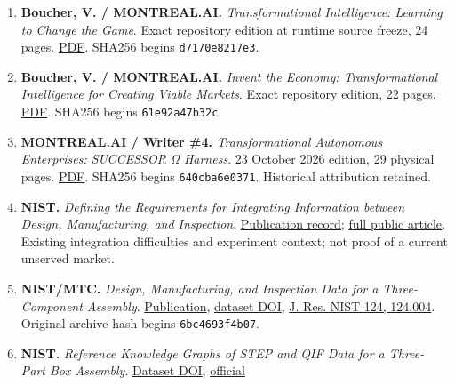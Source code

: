 \documentclass[
  11pt,
]{article}
\providecommand{\tightlist}{%
  \setlength{\itemsep}{0pt}\setlength{\parskip}{0pt}}
\begin{document}
\begin{enumerate}
\def\labelenumi{\arabic{enumi}.}
\tightlist
\item
  \textbf{Boucher, V. / MONTREAL.AI.} \emph{Transformational
  Intelligence: Learning to Change the Game}. Exact repository edition
  at runtime source freeze, 24 pages.
  \href{https://github.com/MontrealAI/AGI-Alpha-Agent-v0/blob/80b345828f34fd8a6e592977dd17ef37141305f4/docs/Transformational_Intelligence.pdf}{PDF}.
  SHA256 begins \texttt{d7170e8217e3}.
\item
  \textbf{Boucher, V. / MONTREAL.AI.} \emph{Invent the Economy:
  Transformational Intelligence for Creating Viable Markets}. Exact
  repository edition, 22 pages.
  \href{https://github.com/MontrealAI/AGI-Alpha-Agent-v0/blob/80b345828f34fd8a6e592977dd17ef37141305f4/docs/Invent_the_Economy.pdf}{PDF}.
  SHA256 begins \texttt{61e92a47b32c}.
\item
  \textbf{MONTREAL.AI / Writer \#4.} \emph{Transformational Autonomous
  Enterprises: SUCCESSOR Ω Harness}. 23 October 2026 edition, 29
  physical pages.
  \href{https://github.com/MontrealAI/AGI-Alpha-Agent-v0/blob/80b345828f34fd8a6e592977dd17ef37141305f4/docs/papers/transformational-autonomous-enterprises-v1.pdf}{PDF}.
  SHA256 begins \texttt{640cba6e0371}. Historical attribution retained.
\item
  \textbf{NIST.} \emph{Defining the Requirements for Integrating
  Information between Design, Manufacturing, and Inspection}.
  \href{https://www.nist.gov/publications/defining-requirements-integrating-information-between-design-manufacturing-and}{Publication
  record};
  \href{https://pmc.ncbi.nlm.nih.gov/articles/PMC11167730/}{full public
  article}. Existing integration difficulties and experiment context;
  not proof of a current unserved market.
\item
  \textbf{NIST/MTC.} \emph{Design, Manufacturing, and Inspection Data
  for a Three-Component Assembly}.
  \href{https://www.nist.gov/publications/design-manufacturing-and-inspection-data-three-component-assembly}{Publication},
  \href{https://doi.org/10.18434/T4/1503154}{dataset DOI},
  \href{https://nvlpubs.nist.gov/nistpubs/jres/124/jres.124.004.pdf}{J.
  Res. NIST 124, 124.004}. Original archive hash begins
  \texttt{6bc4693f4b07}.
\item
  \textbf{NIST.} \emph{Reference Knowledge Graphs of STEP and QIF Data
  for a Three-Part Box Assembly}.
  \href{https://doi.org/10.18434/M32146}{Dataset DOI},
  \href{https://data.nist.gov/od/ds/mds2-2146/qif-ontology-dataset-V2.zip}{official
}
\end{enumerate}
\end{document}
